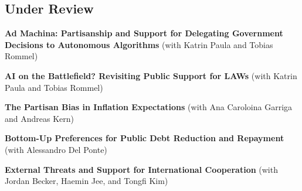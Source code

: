 \documentclass[letterpaper]{article}
\renewenvironment{itemize}{
  \begin{list}{}{
    \setlength{\leftmargin}{1.75em}
  }
}{
  \end{list}
}
\begin{document}
 



\subsection*{Under Review}
\begin{itemize}

	 \item \textbf{Ad Machina: Partisanship and Support for Delegating Government Decisions to Autonomous Algorithms} (with Katrin Paula and Tobias Rommel)	
     \item \textbf{AI on the Battlefield?  Revisiting Public Support for LAWs} (with Katrin Paula and Tobias Rommel)	
	
     	 \item \textbf{The Partisan Bias in Inflation Expectations} (with Ana Caroloina Garriga and Andreas Kern)	
     \item \textbf{Bottom-Up Preferences for Public Debt Reduction and Repayment} (with Alessandro Del Ponte)	
  \item \textbf{External Threats and Support for International Cooperation} (with Jordan Becker, Haemin Jee, and Tongfi Kim)	





  

\end{itemize}




\end{document}
